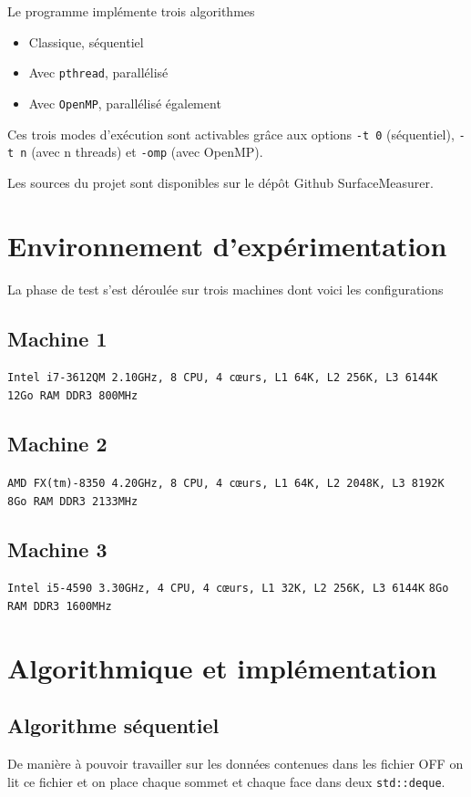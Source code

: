 \documentclass[a4paper]{article}
\begin{document}
Le programme implémente trois algorithmes
\begin{itemize}
	\item Classique, séquentiel
	\item Avec \texttt{pthread}\cite{pthreads}, parallélisé
	\item Avec \texttt{OpenMP}, parallélisé également
\end{itemize}
Ces trois modes d'exécution sont activables grâce aux options \texttt{-t 0} (séquentiel), \texttt{-t n} (avec n threads) et \texttt{-omp} (avec OpenMP).
 
Les sources du projet sont disponibles sur le dépôt Github SurfaceMeasurer\cite{github}.

\section{Environnement d'expérimentation}
La phase de test s'est déroulée sur trois machines dont voici les configurations

\subsection{Machine 1}
\texttt{Intel i7-3612QM 2.10GHz, 8 CPU, 4 cœurs, L1 64K, L2 256K, L3 6144K}
\texttt{12Go RAM DDR3 800MHz}

\subsection{Machine 2}
\texttt{AMD FX(tm)-8350 4.20GHz, 8 CPU, 4 cœurs, L1 64K, L2 2048K, L3 8192K}
\texttt{8Go RAM DDR3 2133MHz}

\subsection{Machine 3}
\texttt{Intel i5-4590 3.30GHz, 4 CPU, 4 cœurs, L1 32K, L2 256K, L3 6144K}
\texttt{8Go RAM DDR3 1600MHz}

\section{Algorithmique et implémentation}
	\subsection{Algorithme séquentiel}
		De manière à pouvoir travailler sur les données contenues dans les fichier OFF on lit ce fichier et on place chaque sommet et chaque face dans deux \texttt{std::deque}.
\end{document}
